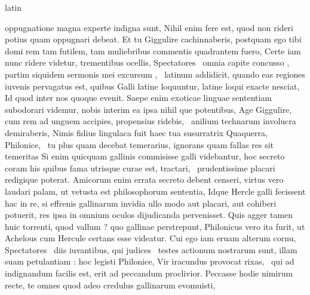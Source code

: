 \documentclass[12pt]{book}
\renewenvironment{latin}
    	{\begin{hyphenrules}{latin}}
    	{\end{hyphenrules}}
\begin{document}
\begin{pages}
\begin{latin}
\begin{Leftside}
                  oppugnatione magna experte indigna sunt, Nihil enim fere est, quod non rideri potius quam oppugnari debeat. Et tu Giggulire cachinnaberis, postquam ego tibi domi rem tam futilem,
                  tam muliebribus commentis quadrantem  fuero, Certe iam nunc ridere videtur, trementibus ocellis, 
                  Spectatores  \ampersand\ omnia capite concusso , partim siquidem sermonis mei excursum , 
                   \ampersand\ latinum addidicit, quando eas regiones iuvenis pervagatus est, quibus Galli latine loquuntur,  latine loqui exacte nesciat, 
                  Id quod inter nos quoque evenit. Saepe enim exoticae linguae sententiam subodorari videmur, nobis interim ea ipsa nihil que potentibus, Age Giggulire, 
                  cum rem ad unguem accipies, propensius ridebis,  \ampersand\  anilium technarum involucra demiraberis, Nimis  fidius lingulaca fuit haec tua susurratrix Quaquerra, Philonice,
                   \ampersand\ tu plus quam decebat temerarius, ignorans quam fallas res sit temeritas Si enim quicquam gallinis commisisse galli videbantur, hoc secreto coram his quibus fama utrisque curae est, tractari,
                   \ampersand\ prudentissime placari redigique poterat. Amicorum enim errata secreto debent censeri, virtus vero laudari palam, ut vetusta est philosophorum sententia, 
                  Idque Hercle galli fecissent hac in re, si effrenis gallinarum invidia ullo modo aut placari, aut cohiberi potuerit,  res
                  ipsa in omnium oculos dijudicanda pervenisset. Quis agger tamen huic torrenti, quod vallum ? 
                  quo gallinae perstrepunt, Philonicus vero ita furit, ut Achelous cum Hercule certans esse videatur. Cui ego iam eruam alterum cornu, Spectatores  \ampersand\ diis iuvantibus, 
                  qui judices  \ampersand\ testes actionum nostrarum sunt, illam suam  petulantiam :
                   hoc legisti Philonice, Vir iracundus provocat rixas,  \ampersand\ qui ad indignandum facilis est, erit ad peccandum proclivior.
                  Peccasse hodie nimirum recte, te omnes  quod adeo credulus  gallinarum  evomuisti, 

\end{Leftside}
\end{latin}
\end{pages}
\end{document}

